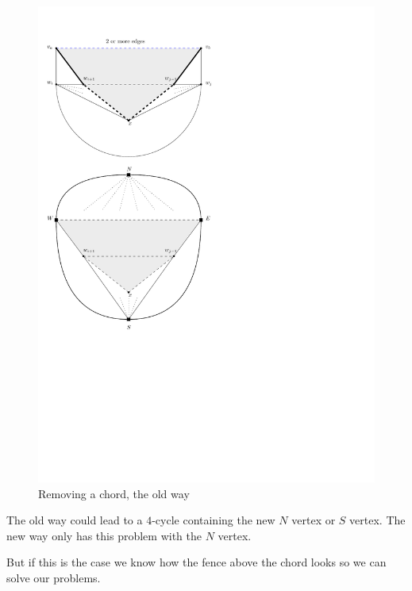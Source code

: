 \begin{figure}[h]
  \centering
  \includegraphics[scale=.6]{img/removeChordOld.pdf}
  \caption{Removing a chord, the old way}
  \label{fig:removechordOld}
\end{figure}

The old way could lead to a $4$-cycle containing the new $N$ vertex or $S$ vertex. The new way only has this problem with the $N$ vertex.

But if this is the case we know how the fence above the chord looks so we can solve our problems.

